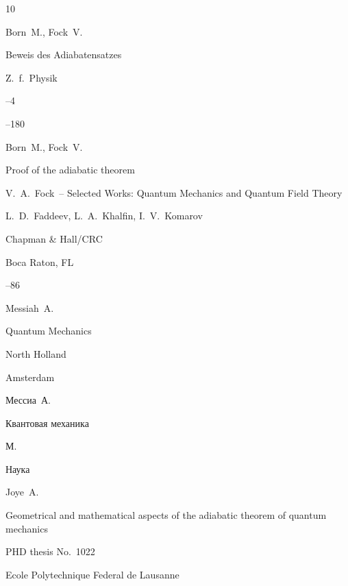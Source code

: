 \begin{thebibliography}{10}




\by Born~M., Fock~V.

\paper Beweis des Adiabatensatzes

\jour Z.~f.~Physik


--4


--180


\transl 

\by Born~M., Fock~V.

\paper Proof of the adiabatic theorem 

\inbook V.~A.~Fock~-- Selected Works: Quantum Mechanics and Quantum Field Theory

\eds  L.~D.~Faddeev, L.~A.~Khalfin, I.~V.~Komarov

\publ Chapman \& Hall/CRC

\publaddr Boca Raton, FL


--86




\by Messiah~A.

\book Quantum Mechanics


\publ North Holland

\publaddr Amsterdam


\rtransl

\by Мессиа~А. 

\book Квантовая механика


\publaddr М.

\publ Наука






\by Joye~A.

\thesis Geometrical and mathematical aspects of the adiabatic theorem of quantum mechanics

\thesisinfo PHD thesis No.~1022

\publaddr  Ecole Polytechnique Federal de Lausanne


\end{thebibliography}
